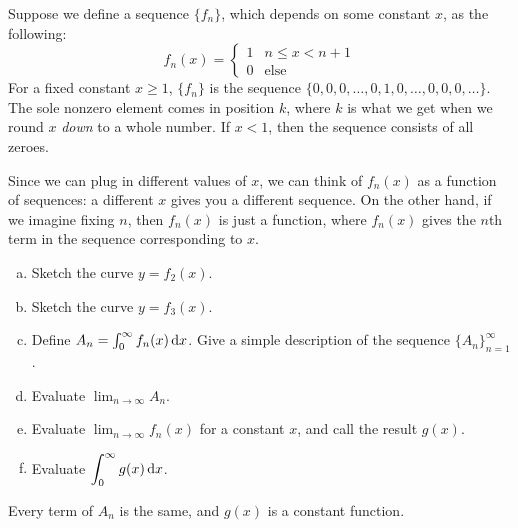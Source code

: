 


\begin{question}
Suppose we define a sequence $\{f_n\}$, which depends on some constant $x$, as the following:
\[f_n(x) = \begin{cases}
1 & n \leq x < n+1\\
0 & \text{else}
\end{cases}\]
For a fixed constant $x \ge 1$, $\{f_n\}$ is the sequence $\{0,0,0,\ldots,0,1,0,\ldots,0,0,0,\ldots\}$. The sole nonzero element comes in position $k$, where $k$ is what we get when we round $x$ \emph{down} to a whole number. If $x<1$, then the sequence consists of all zeroes.

Since we can plug in different values of $x$, we can think of $f_n(x)$ as a function of sequences: a different $x$ gives you a different sequence. On the other hand, if we imagine fixing $n$, then $f_n(x)$ is just a function, where $f_n(x)$ gives the $n$th term in the sequence corresponding to $x$.

\begin{enumerate}[(a)]
\item Sketch the curve $y=f_2(x)$.
\item Sketch the curve $y=f_3(x)$.
\item Define $A_n = \int_0^\infty f_n(x)\,\mathrm{d}x$. Give a simple description of the sequence $\{A_n\}_{n=1}^\infty$.
\item Evaluate $\displaystyle\lim_{n \to \infty}A_n$.
\item Evaluate $\displaystyle\lim_{n \to \infty}  f_n(x)$ for a constant $x$, and call the result $g(x)$.
\item Evaluate $\displaystyle \int_0^\infty g(x)\,\mathrm{d}x$.
\end{enumerate}
\end{question}
\begin{hint}
Every term of $A_n$ is the same, and $g(x)$ is a constant function.
\end{hint}
